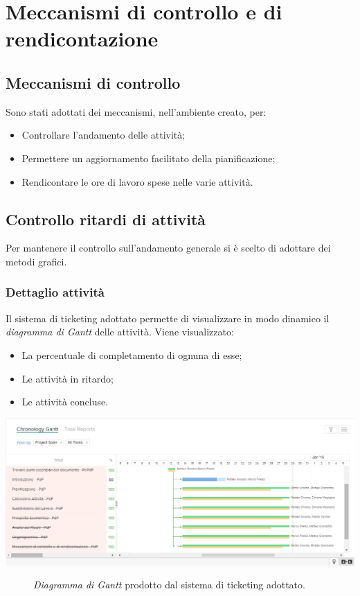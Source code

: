 \newpage
\section{Meccanismi di controllo e di rendicontazione}
	\subsection{Meccanismi di controllo} Sono stati adottati dei meccanismi, nell'ambiente creato, per:
	\begin{itemize}
		\item Controllare l'andamento delle attività;
		\item Permettere un aggiornamento facilitato della pianificazione;
		\item Rendicontare le ore di lavoro spese nelle varie attività.
	\end{itemize}
	\subsection{Controllo ritardi di attività}  Per mantenere il controllo sull'andamento generale si è scelto di adottare dei metodi grafici.
		\subsubsection{Dettaglio attività} Il sistema di ticketing adottato permette di visualizzare in modo dinamico il \textit{diagramma di  Gantt} delle attività. Viene visualizzato:
		\begin{itemize}
			\item La percentuale di completamento di ognuna di esse;
			\item Le attività in ritardo;
			\item Le attività concluse.
		\end{itemize}
		\begin{center}
			\includegraphics[keepaspectratio = true, width=16cm]{immagini/PdP_ZohoGantt.png}
		\end{center}
		\begin{figure}[h]
			\caption{\textit{Diagramma di Gantt} prodotto dal sistema di ticketing adottato.}\label{etichetta}
		\end{figure}
